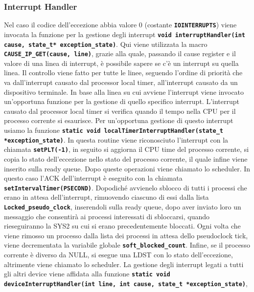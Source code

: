 \documentclass{article}
\newcounter{subsubsubsection}
\begin{document}
\subsubsection{Interrupt Handler}
Nel caso il codice dell'eccezione abbia valore 0 (costante \texttt{\textbf{IOINTERRUPTS}}) viene invocata la funzione per la 
gestione degli interrupt \texttt{\textbf{void interruptHandler(int cause, state\_t* exception\_state)}}. Qui viene 
utilizzata la macro \texttt{\textbf{CAUSE\_IP\_GET(cause, line)}}, grazie alla quale, passando il cause register e il 
valore di una linea di interrupt, è possibile sapere se c'è un interrupt su quella linea. Il controllo viene fatto per tutte 
le linee, seguendo l'ordine di priorità che va dall'interrupt causato dal processor local timer, all'interrupt causato da un 
dispositivo terminale. In base alla linea su cui avviene l'interrupt viene invocato un'opportuna funzione per la gestione 
di quello specifico interrupt.
L'interrupt causato dal processor local timer si verifica quando il tempo nella CPU per il processo corrente si esaurisce. 
Per un'opportuna gestione di questo interrupt usiamo la funzione \texttt{\textbf{static void localTimerInterruptHandler(state\_t *exception\_state)}}. In questa routine viene riconosciuto l'interrupt con la chiamata \texttt{\textbf{setPLT(-1)}}, 
in seguito si aggiorna il CPU time del processo corrente, si copia lo stato dell'eccezione nello stato del processo corrente, il quale infine viene inserito sulla ready queue. Dopo queste operazioni viene chiamato lo scheduler.
In questo caso l'ACK  dell'interrupt è eseguito con la chiamata \texttt{\textbf{setIntervalTimer(PSECOND)}}. Dopodiché avvienelo sblocco di tutti i processi che erano in attesa dell'interrupt, rimuovendo ciascuno di essi dalla lista \texttt{\textbf{Locked\_pseudo\_clock}}, inserendoli sulla ready queue, dopo aver inviato loro un messaggio che consentirà ai processi 
interessati di sbloccarsi, quando rieseguiranno la SYS2 su cui si erano precedentemente bloccati. Ogni volta che viene rimosso un processo dalla lista dei processi in attesa dello pseudoclock tick, viene decrementata la variabile globale 
\texttt{\textbf{soft\_blocked\_count}}. Infine, se il processo corrente è diverso da NULL, si esegue una LDST con lo stato 
dell'eccezione, altrimente viene chiamato lo scheduler.
La gestione degli interrupt legati a tutti gli altri device viene affidata alla funzione \texttt{\textbf{static void deviceInterruptHandler(int line, int cause, state\_t *exception\_state)}}, 
\end{document}
